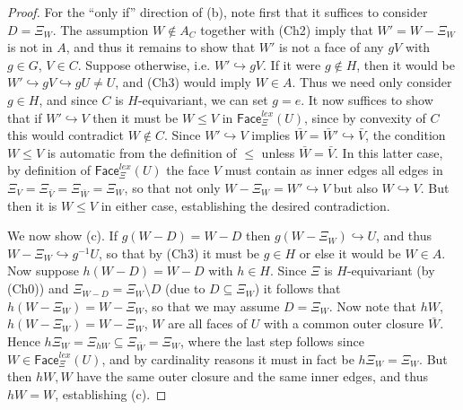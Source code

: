 \documentclass[a4paper,10pt
,draft
]{article}%
\begin{document}
\begin{proof}
For the ``only if'' direction of (b), 
note first that it suffices to consider $D = \Xi_W$.
The assumption $W \not \in A_C$ together with (Ch2) imply that
$W'=W-\Xi_{W}$ is not in $A$, and thus it remains to show that 
$W'$ is not a face of any $gV$ with $g\in G$, $V \in C$.
Suppose otherwise, i.e. $W' \hookrightarrow gV$.
If it were $g \not \in H$, 
then it would be $W' \hookrightarrow gV \hookrightarrow g U \neq U$, and (Ch3) would imply $W\in A$. Thus we need only consider $g\in H$, and since $C$ is $H$-equivariant, we can set $g=e$.
It now suffices to show that if $W' \hookrightarrow V$
then it must be $W \leq V$ in $\mathsf{Face}_{\Xi}^{lex}(U)$,
since by convexity of $C$ this would contradict $W \not \in C$.
Since $W' \hookrightarrow V$ implies 
$\bar{W} = \bar{W}' \hookrightarrow \bar{V}$,
the condition $W \leq V$ is automatic from the definition of $\leq$ unless $\bar{W} = \bar{V}$.
In this latter case, by definition of 
$\mathsf{Face}_{\Xi}^{lex}(U)$ the face $V$ must contain as inner edges all edges in 
$\Xi_V=\Xi_{\bar{V}} = \Xi_{\bar{W}} = \Xi_{W}$,
so that not only $W - \Xi_{W} = W' \hookrightarrow V$ but also $W \hookrightarrow V$. But then it is $W \leq V$ in either case, establishing the desired contradiction. 


We now show (c).
If $g(W-D)=W-D$ then $g(W - \Xi_W) \hookrightarrow U$,
and thus $W - \Xi_W \hookrightarrow g^{-1}U$,
so that by (Ch3) it must be $g \in H$ or else it would be $W \in A$.
Now suppose $h(W-D)=W-D$ with $h\in H$.
Since $\Xi$ is $H$-equivariant (by (Ch0)) and
$\Xi_{W-D} = \Xi_{W} \setminus D$ (due to $D \subseteq \Xi_{W}$) it follows that 
$h(W-\Xi_W)=W-\Xi_W$,
so that we may assume $D=\Xi_W$.
Now note that
$hW$, $h(W-\Xi_W)=W-\Xi_W$, $W$
are all faces of $U$ with a common outer closure $\bar{W}$.
Hence
$h\Xi_{W} = \Xi_{hW} \subseteq \Xi_{\bar{W}} = \Xi_{W}$, where the last step follows since
$W \in \mathsf{Face}_{\Xi}^{lex}(U)$, and by cardinality reasons it must in fact be $h \Xi_{W} = \Xi_{W}$. But then $hW,W$
have the same outer closure and the same inner edges, and thus 
$hW=W$, establishing (c).



\end{proof}
\end{document}
